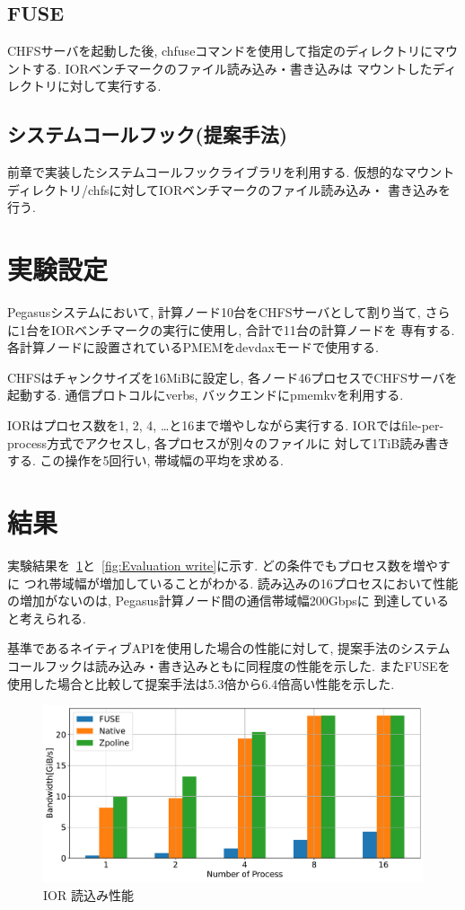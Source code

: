 \documentclass[a4paper,11pt]{jreport}
\begin{document}
\subsection{FUSE}
CHFSサーバを起動した後, chfuseコマンドを使用して指定のディレクトリにマウントする. IORベンチマークのファイル読み込み・書き込みは
マウントしたディレクトリに対して実行する. 
\subsection{システムコールフック(提案手法)}
前章で実装したシステムコールフックライブラリを利用する. 仮想的なマウントディレクトリ/chfsに対してIORベンチマークのファイル読み込み・
書き込みを行う. 
\section{実験設定}
Pegasusシステムにおいて, 計算ノード10台をCHFSサーバとして割り当て, さらに1台をIORベンチマークの実行に使用し, 合計で11台の計算ノードを
専有する. 各計算ノードに設置されているPMEMをdevdaxモードで使用する. 

CHFSはチャンクサイズを16MiBに設定し, 各ノード46プロセスでCHFSサーバを起動する. 通信プロトコルにverbs, バックエンドにpmemkvを利用する. 

IORはプロセス数を1, 2, 4, …と16まで増やしながら実行する. IORではfile-per-process方式でアクセスし, 各プロセスが別々のファイルに
対して1TiB読み書きする. この操作を5回行い, 帯域幅の平均を求める. 
\section{結果}

実験結果を\figurename~\ref{fig:Evaluation read}と\figurename~\ref{fig:Evaluation write}に示す. どの条件でもプロセス数を増やすに
つれ帯域幅が増加していることがわかる. 読み込みの16プロセスにおいて性能の増加がないのは, Pegasus計算ノード間の通信帯域幅200Gbpsに
到達していると考えられる. 

基準であるネイティブAPIを使用した場合の性能に対して, 提案手法のシステムコールフックは読み込み・書き込みともに同程度の性能を示した. 
またFUSEを使用した場合と比較して提案手法は5.3倍から6.4倍高い性能を示した. 

\newpage

\begin{figure}[h]
	\begin{minipage}[b]{1\columnwidth}
		\centering
		\includegraphics[width=0.9\linewidth]{./figure/ior_benchmark_read.pdf}
		\caption{IOR 読込み性能}
		\label{fig:Evaluation read}
	\end{minipage}
\end{figure}
\end{document}
